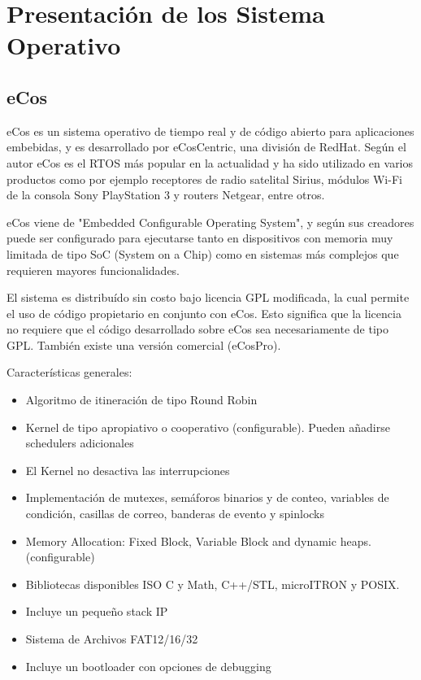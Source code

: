  	

		\section{Presentación de los Sistema Operativo}
 		
			 	\subsection{eCos}

eCos \cite{Etiqueta35} es un sistema operativo de tiempo real y de código abierto para aplicaciones embebidas, y es desarrollado por eCosCentric, una división de RedHat. Según el autor eCos es el RTOS más popular en la actualidad y ha sido utilizado en varios productos como 
por ejemplo receptores de radio satelital Sirius, módulos Wi-Fi de la consola Sony PlayStation 3 
y routers Netgear, entre otros. 


 eCos viene de "Embedded Configurable Operating System", y según sus creadores puede ser configurado para ejecutarse tanto en dispositivos con memoria muy limitada de tipo SoC (System on a Chip) como en sistemas más complejos que requieren mayores funcionalidades. 
 
El sistema es distribuído sin costo bajo licencia GPL modificada, la cual permite el uso de código propietario en conjunto con eCos. Esto significa que la licencia no requiere que el código desarrollado sobre eCos sea necesariamente de tipo GPL. También existe una versión comercial 
(eCosPro).

Características generales: 
				\begin{itemize}
				  	\item Algoritmo de itineración de tipo Round Robin
					\item Kernel de tipo apropiativo o cooperativo (configurable). Pueden añadirse schedulers 
 adicionales
					\item El Kernel no desactiva las interrupciones
					\item Implementación de mutexes, semáforos binarios y de conteo, variables de condición, 
 casillas de correo, banderas de evento y spinlocks
					\item Memory Allocation: Fixed Block, Variable Block and dynamic heaps. (configurable)
					\item Bibliotecas disponibles ISO C y Math, C++/STL, microITRON y POSIX. 
					\item  Incluye un pequeño stack IP
					\item Sistema de Archivos FAT12/16/32
					\item Incluye un bootloader con opciones de debugging
				\end{itemize}			

